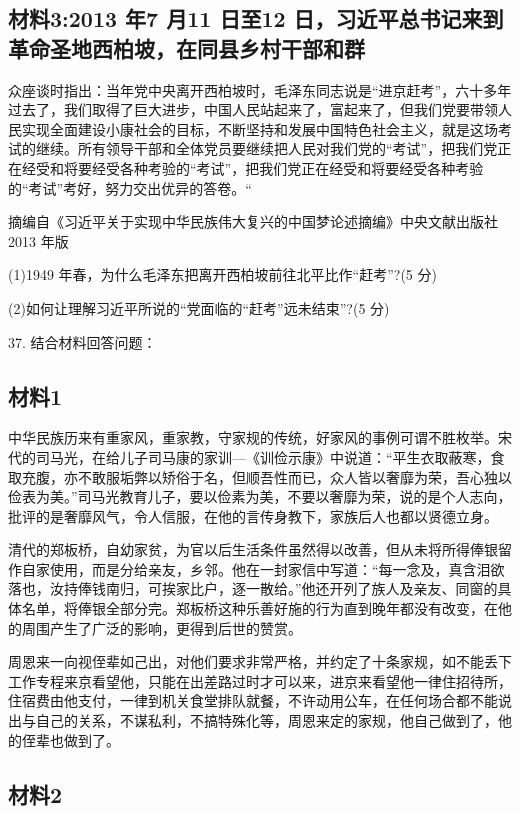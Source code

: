 \documentclass[UTF8,11pt]{ctexart}
\begin{document}
\subsection*{材料3:2013 年7 月11 日至12 日，习近平总书记来到革命圣地西柏坡，在同县乡村干部和群}

众座谈时指出：当年党中央离开西柏坡时，毛泽东同志说是“进京赶考”，六十多年过去了，我们取得了巨大进步，中国人民站起来了，富起来了，但我们党要带领人民实现全面建设小康社会的目标，不断坚持和发展中国特色社会主义，就是这场考试的继续。所有领导干部和全体党员要继续把人民对我们党的“考试”，把我们党正在经受和将要经受各种考验的“考试”，把我们党正在经受和将要经受各种考验的“考试”考好，努力交出优异的答卷。“

摘编自《习近平关于实现中华民族伟大复兴的中国梦论述摘编》中央文献出版社2013 年版

(1)1949 年春，为什么毛泽东把离开西柏坡前往北平比作“赶考”?(5 分)


(2)如何让理解习近平所说的“党面临的“赶考”远未结束”?(5 分)


37. 结合材料回答问题：


\subsection*{材料1}

中华民族历来有重家风，重家教，守家规的传统，好家风的事例可谓不胜枚举。宋代的司马光，在给儿子司马康的家训—《训俭示康》中说道：“平生衣取蔽寒，食取充腹，亦不敢服垢弊以矫俗于名，但顺吾性而已，众人皆以奢靡为荣，吾心独以俭表为美。”司马光教育儿子，要以俭素为美，不要以奢靡为荣，说的是个人志向，批评的是奢靡风气，令人信服，在他的言传身教下，家族后人也都以贤德立身。

清代的郑板桥，自幼家贫，为官以后生活条件虽然得以改善，但从未将所得俸银留作自家使用，而是分给亲友，乡邻。他在一封家信中写道：“每一念及，真含泪欲落也，汝持俸钱南归，可挨家比户，逐一散给。”他还开列了族人及亲友、同窗的具体名单，将俸银全部分完。郑板桥这种乐善好施的行为直到晚年都没有改变，在他的周围产生了广泛的影响，更得到后世的赞赏。

周恩来一向视侄辈如己出，对他们要求非常严格，并约定了十条家规，如不能丢下工作专程来京看望他，只能在出差路过时才可以来，进京来看望他一律住招待所，住宿费由他支付，一律到机关食堂排队就餐，不许动用公车，在任何场合都不能说出与自己的关系，不谋私利，不搞特殊化等，周恩来定的家规，他自己做到了，他的侄辈也做到了。

\subsection*{材料2}
\end{document}
